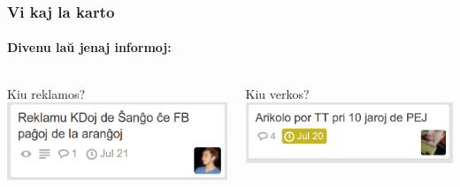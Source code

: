   \begin{frame}
    \frametitle{Vi kaj la karto}
    \framesubtitle{Divenu laŭ jenaj informoj:}
    	
    \begin{columns}
    
    
    \begin{block}{Kiu reklamos?}
		\includegraphics[scale=0.25]{ekranoj/kd-shangho}
    \end{block}
    
        
    \begin{block}{Kiu verkos?}    
    	\includegraphics[scale=0.25]{ekranoj/artikolo-por-tt}
    \end{block}
    
    \end{columns}
  \end{frame}

